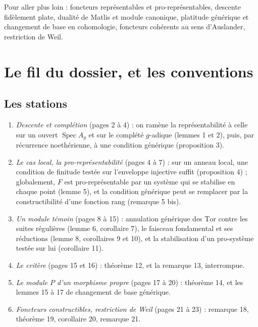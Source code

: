 \documentclass[11pt,a4paper]{article}
\begin{document}
\begin{resume}
Pour aller plus loin : foncteurs représentables et pro-représentables, descente
fidèlement plate, dualité de Matlis et module canonique, platitude générique et
changement de base en cohomologie, foncteurs cohérents au sens d'Auslander,
restriction de Weil.

\end{resume}

\section*{Le fil du dossier, et les conventions}

\subsection*{Les stations}

\begin{enumerate}
\item[I.] \emph{Descente et complétion} (pages 2 à 4) : on ramène la
représentabilité à celle sur un ouvert $\operatorname{Spec} A_g$ et sur le
complété $g$-adique (lemmes 1 et 2), puis, par récurrence noethérienne, à une
condition générique (proposition 3).
\item[II.] \emph{Le cas local, la pro-représentabilité} (pages 4 à 7) : sur un
anneau local, une condition de finitude testée sur l'enveloppe injective
suffit (proposition 4) ; globalement, $F$ est pro-représentable par un système
qui se stabilise en chaque point (lemme 5), et la condition générique peut se
remplacer par la constructibilité d'une fonction rang (remarque 5 bis).
\item[III.] \emph{Un module témoin} (pages 8 à 15) : annulation générique des
$\mathrm{Tor}$ contre les suites régulières (lemme 6, corollaire 7), le
faisceau fondamental et ses réductions (lemme 8, corollaires 9 et 10), et la
stabilisation d'un pro-système testée sur lui (corollaire 11).
\item[IV.] \emph{Le critère} (pages 15 et 16) : théorème 12, et la
remarque 13, interrompue.
\item[V.] \emph{Le module $P$ d'un morphisme propre} (pages 17 à 20) :
théorème 14, et les lemmes 15 à 17 de changement de base générique.
\item[VI.] \emph{Foncteurs constructibles, restriction de Weil} (pages 21 à
23) : remarque 18, théorème 19, corollaire 20, remarque 21.
\end{enumerate}
\end{document}
